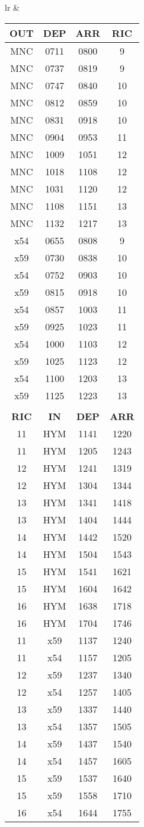 \documentclass[a4paper]{article}
\newcommand{\train}[3]{
  MNC & #1 & #2 & #3 \\
}
\newcommand{\trainr}[3]{
  #1 & HYM & #2 & #3 \\
}
\newcommand{\busf}[3]{
  x54 & #1 & #2 & #3 \\
}
\newcommand{\busn}[3]{
  x59 & #1 & #2 & #3 \\
}
\newcommand{\busfr}[3]{
  #1 & x54 & #2 & #3 \\
}
\newcommand{\busnr}[3]{
  #1 & x59 & #2 & #3 \\
}
\begin{document}
\begin{tabular}{lr}
  &
  \begin{tabular}{c|c|c|c} 
    \textbf{OUT} & \textbf{DEP} & \textbf{ARR} & \textbf{RIC}\\
    \hline
    \train{0711}{0800}{9}
    \train{0737}{0819}{9}
    \train{0747}{0840}{10}
    \train{0812}{0859}{10}
    \train{0831}{0918}{10}
    \train{0904}{0953}{11}
    \train{1009}{1051}{12}
    \train{1018}{1108}{12}
    \train{1031}{1120}{12}
    \train{1108}{1151}{13}
    \train{1132}{1217}{13}
    \hline
    \busf{0655}{0808}{9}
    \busn{0730}{0838}{10}
    \busf{0752}{0903}{10}
    \busn{0815}{0918}{10}
    \busf{0857}{1003}{11}
    \busn{0925}{1023}{11}
    \busf{1000}{1103}{12}
    \busn{1025}{1123}{12}
    \busf{1100}{1203}{13}
    \busn{1125}{1223}{13}
    & & & \\
    \textbf{RIC} & \textbf{IN} & \textbf{DEP} & \textbf{ARR}\\
    \hline
    \trainr{11}{1141}{1220}
    \trainr{11}{1205}{1243}
    \trainr{12}{1241}{1319}
    \trainr{12}{1304}{1344}
    \trainr{13}{1341}{1418}
    \trainr{13}{1404}{1444}
    \trainr{14}{1442}{1520}
    \trainr{14}{1504}{1543}
    \trainr{15}{1541}{1621}
    \trainr{15}{1604}{1642}
    \trainr{16}{1638}{1718}
    \trainr{16}{1704}{1746}
    \hline
    \busnr{11}{1137}{1240}
    \busfr{11}{1157}{1205}
    \busnr{12}{1237}{1340}
    \busfr{12}{1257}{1405}
    \busnr{13}{1337}{1440}
    \busfr{13}{1357}{1505}
    \busnr{14}{1437}{1540}
    \busfr{14}{1457}{1605}
    \busnr{15}{1537}{1640}
    \busnr{15}{1558}{1710}
    \busfr{16}{1644}{1755}
    \hline
  \end{tabular}
  
\end{tabular}
\end{document}
